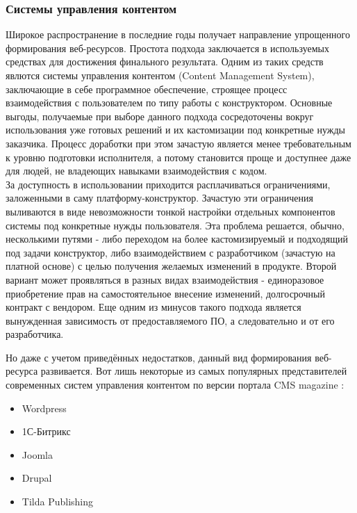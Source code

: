     \subsubsection{Системы управления контентом}
        Широкое распространение в последние годы получает направление упрощенного формирования веб-ресурсов.
        Простота подхода заключается в используемых средствах для достижения финального результата.
        Одним из таких средств явлются системы управления контентом (Content Management System), заключающие в себе программное обеспечение, строящее процесс взаимодействия с пользователем по типу работы с конструктором. %
        Основные выгоды, получаемые при выборе данного подхода сосредоточены вокруг использования уже готовых решений и их кастомизации под конкретные нужды заказчика.
        Процесс доработки при этом зачастую является менее требовательным к уровню подготовки исполнителя, а потому становится проще и доступнее даже для людей, не владеющих навыками взаимодействия с кодом.\\
        За доступность в использовании приходится расплачиваться ограничениями, заложенными в саму платформу-конструктор.
        Зачастую эти ограничения выливаются в виде невозможности тонкой настройки отдельных компонентов системы под конкретные нужды пользователя.
        Эта проблема решается, обычно, несколькими путями - либо переходом на более кастомизируемый и подходящий под задачи конструктор, либо взаимодействием с разработчиком (зачастую на платной основе) с целью получения желаемых изменений в продукте.
        Второй вариант может проявляться в разных видах взаимодействия - единоразовое приобретение прав на самостоятельное внесение изменений, долгосрочный контракт с вендором.
        Еще одним из минусов такого подхода является вынужденная зависимость от предоставляемого ПО, а следовательно и от его разработчика.

        Но даже с учетом приведённых недостатков, данный вид формирования веб-ресурса развивается.
        Вот лишь некоторые из самых популярных представителей современных систем управления контентом по версии портала CMS magazine \cite{}:
        \begin{itemize}
            \item Wordpress
            \item 1С-Битрикс
            \item Joomla
            \item Drupal
            \item Tilda Publishing
        \end{itemize}

